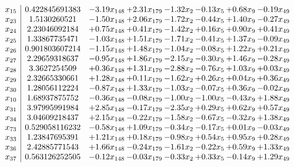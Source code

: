 \documentclass[8pt]{article}
\begin{document}
\[\begin{array}{c| c c@{\hskip 2pt} c@{\hskip 2pt} c@{\hskip 2pt} c@{\hskip 2pt} c@{\hskip 2pt} c@{\hskip 2pt} }
 x_{15}   &  0.422845691383 & -3.19 x_{148} & +  2.31 x_{179} & -1.32 x_{2} & -0.13 x_{5} & +  0.68 x_{9} & -0.19 x_{49}\\
 x_{23}   &  1.5130260521 & -1.50 x_{148} & +  2.06 x_{179} & -1.72 x_{2} & -0.44 x_{5} & +  1.40 x_{9} & -0.27 x_{49}\\
 x_{24}   &  2.23046092184 & +  0.75 x_{148} & +  0.41 x_{179} & -1.42 x_{2} & +  0.16 x_{5} & +  0.90 x_{9} & +  0.41 x_{49}\\
 x_{25}   &  1.33867735471 & -1.03 x_{148} & +  1.51 x_{179} & -1.71 x_{2} & -0.41 x_{5} & +  1.37 x_{9} & -0.09 x_{49}\\
 x_{26}   &  0.901803607214 & -1.15 x_{148} & +  1.48 x_{179} & -1.04 x_{2} & -0.08 x_{5} & +  1.22 x_{9} & +  0.21 x_{49}\\
 x_{27}   &  2.29659318637 & -0.95 x_{148} & +  1.86 x_{179} & -2.15 x_{2} & -0.30 x_{5} & +  1.46 x_{9} & -0.28 x_{49}\\
 x_{28}   &  3.3627254509 & +  0.36 x_{148} & +  1.31 x_{179} & -2.88 x_{2} & -0.76 x_{5} & +  1.03 x_{9} & +  0.03 x_{49}\\
 x_{29}   &  2.32665330661 & +  1.28 x_{148} & +  0.11 x_{179} & -1.62 x_{2} & +  0.26 x_{5} & +  0.04 x_{9} & +  0.36 x_{49}\\
 x_{30}   &  1.28056112224 & -0.87 x_{148} & +  1.33 x_{179} & -1.03 x_{2} & -0.07 x_{5} & +  0.36 x_{9} & -0.02 x_{49}\\
 x_{10}   &  1.68937875752 & -0.36 x_{148} & -0.08 x_{179} & -1.00 x_{2} & -1.00 x_{5} & -0.43 x_{9} & +  1.88 x_{49}\\
 x_{31}   &  3.97995991984 & +  2.85 x_{148} & -0.17 x_{179} & -2.35 x_{2} & +  0.29 x_{5} & +  0.62 x_{9} & +  0.57 x_{49}\\
 x_{34}   &  3.04609218437 & +  2.15 x_{148} & -0.22 x_{179} & -1.58 x_{2} & -0.67 x_{5} & -0.32 x_{9} & +  1.38 x_{49}\\
 x_{73}   &  0.529058116232 & -0.58 x_{148} & +  1.09 x_{179} & -0.34 x_{2} & -0.17 x_{5} & +  0.01 x_{9} & -0.03 x_{49}\\
 x_{33}   &  1.23847695391 & +  1.21 x_{148} & +  0.18 x_{179} & -0.98 x_{2} & +  0.54 x_{5} & +  0.95 x_{9} & +  0.28 x_{49}\\
 x_{36}   &  2.42885771543 & +  1.66 x_{148} & -0.24 x_{179} & -1.61 x_{2} & -0.22 x_{5} & +  0.59 x_{9} & +  1.33 x_{49}\\
 x_{37}   &  0.563126252505 & -0.12 x_{148} & -0.03 x_{179} & -0.33 x_{2} & +  0.33 x_{5} & -0.14 x_{9} & +  1.29 x_{49}\\

\end{array}\]
\end{document}
